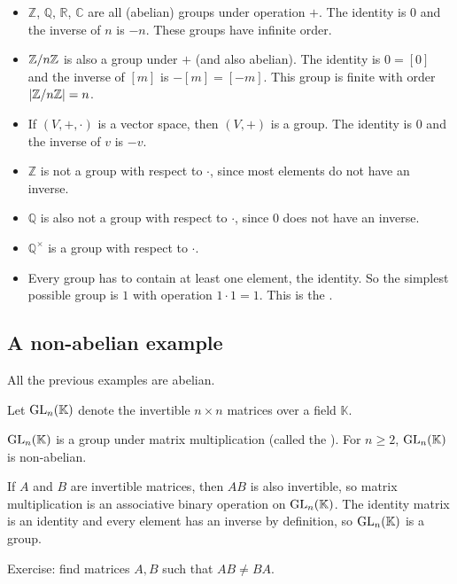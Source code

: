 \documentclass[12pt,letterpaper]{report}
\begin{document}
\begin{ex}
  \begin{itemize}
    \item
    $\mathbb{Z}$, $\mathbb{Q}$, $\mathbb{R}$, $\mathbb{C}$ are all (abelian) groups under operation
    $+$.
    The identity is $0$ and the inverse of $n$ is $-n$.
    These groups have infinite order.
    \item
    $\mathbb{Z}/{n}\mathbb{Z}$ is also a group under $+$ (and also abelian).
    The identity is $0 = [0]$ and the inverse of $[m]$ is $-[m] = [-m]$.
    This group is finite with order $\lvert\mathbb{Z}/{n}\mathbb{Z}\rvert = n$.
    \item
    If $(V, +, \cdot)$ is a vector space, then $(V, +)$ is a group.
    The identity is $0$ and the inverse of $v$ is $-v$.
    \item
    $\mathbb{Z}$ is not a group with respect to $\cdot$, since most elements do not have an inverse.
    \item
    $\mathbb{Q}$ is also not a group with respect to $\cdot$, since $0$ does not have an inverse.
    \item
    $\mathbb{Q}^\times$ is a group with respect to $\cdot$.
    \item
    Every group has to contain at least one element, the identity.
    So the simplest possible group is ${1}$ with operation $1 \cdot 1 = 1$.
    This is the .
  \end{itemize}
\end{ex}

\pagebreak
\subsection{A non-abelian example}

All the previous examples are abelian.

Let $\operatorname{GL}_n(\mathbb{K})$ denote the invertible $n \times n$ matrices over a field $\mathbb{K}$.

\begin{prop}{}{}
  $\operatorname{GL}_n(\mathbb{K})$ is a group under matrix multiplication (called the
  ).
  For $n \geq 2$, $\operatorname{GL}_n(\mathbb{K})$ is non-abelian.
\end{prop}

\begin{thmproof}
  If $A$ and $B$ are invertible matrices, then $AB$ is also invertible, so matrix multiplication is
  an associative binary operation on $\operatorname{GL}_n(\mathbb{K})$.
  The identity matrix is an identity and every element has an inverse by definition, so
  $\operatorname{GL}_n(\mathbb{K})$ is a group.

  Exercise: find matrices $A, B$ such that $AB \neq BA$.
\end{thmproof}
\end{document}
